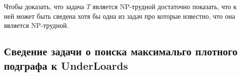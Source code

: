 \documentclass{article}
\begin{document}
Чтобы доказать, что задача $T$ является NP-трудной достаточно показать, что  к ней может быть сведена хотя бы одна из задач про которые известно, что она является NP-трудной.  



\subsection{Сведение задачи о поиска максимальго плотного подграфа к UnderLoards}
\end{document}

